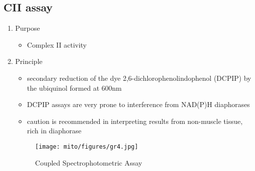 \documentclass{scrartcl}
\begin{document}
\subsection{CII assay}
\label{sec:orgfd465f7}
\begin{enumerate}
\item Purpose
\label{sec:orge5cb6d0}
\begin{itemize}
\item Complex II activity
\end{itemize}
\item Principle
\label{sec:org647efaf}
\begin{itemize}
\item secondary reduction of the dye 2,6-dichlorophenolindophenol (DCPIP)
by the ubiquinol formed at 600nm
\item DCPIP assays are very prone to interference from NAD(P)H
diaphorases
\item caution is recommended in interpreting results from non-muscle
tissue, rich in diaphorase
\end{itemize}


\begin{figure}[htbp]
\centering
\texttt{[image: mito/figures/gr4.jpg]}
\caption{\label{fig:orgced0c6d}Coupled Spectrophotometric Assay}
\end{figure}
\end{enumerate}
\end{document}
